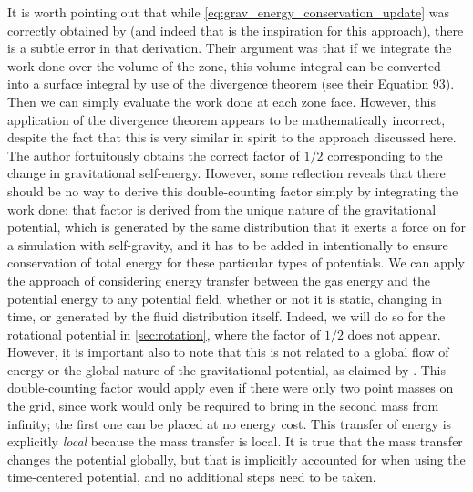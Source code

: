 \documentclass[iop]{../emulateapj}
\begin{document}
It is worth pointing out that while \autoref{eq:grav_energy_conservation_update} was correctly obtained 
by \cite{arepo} (and indeed that is the inspiration for this approach), there is a subtle error in that derivation. 
Their argument was that if we integrate the work done over the volume of the zone, this volume integral can be 
converted into a surface integral by use of the divergence theorem (see their Equation 93). Then we can simply 
evaluate the work done at each zone face. However, this application of the divergence theorem appears to be 
mathematically incorrect, despite the fact that this is very similar in spirit to the approach discussed here. 
The author fortuitously obtains the correct factor of $1/2$ corresponding to the change in gravitational self-energy.
However, some reflection reveals that there should be no way to derive this double-counting factor simply by integrating 
the work done: that factor is derived from the unique nature of the gravitational potential, which is generated 
by the same distribution that it exerts a force on for a simulation with self-gravity, and it has to be added in 
intentionally to ensure conservation of total energy for these particular types of potentials. We can apply 
the approach of considering energy transfer between the gas energy and the potential energy to any potential field, 
whether or not it is static, changing in time, or generated by the fluid distribution itself. 
Indeed, we will do so for the rotational potential in \autoref{sec:rotation}, where the 
factor of $1/2$ does not appear. However, it is important also to note that this is not related to a 
global flow of energy or the global nature of the gravitational potential, as claimed by \cite{marcello:2012}. 
This double-counting factor would apply even if there were only two point masses on the grid, since 
work would only be required to bring in the second mass from infinity; the first one can be 
placed at no energy cost. This transfer of energy is explicitly \textit{local} because the 
mass transfer is local. It is true that the mass transfer changes the potential globally, 
but that is implicitly accounted for when using the time-centered potential, and no 
additional steps need to be taken.
\end{document}

